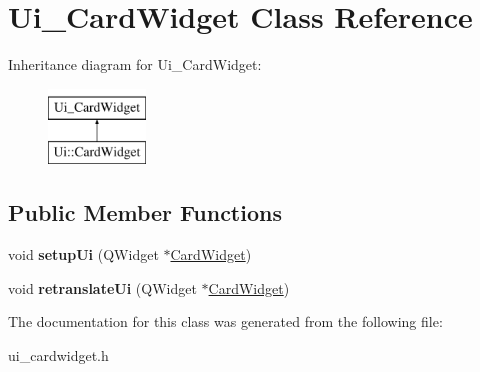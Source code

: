 \hypertarget{class_ui___card_widget}{}\section{Ui\+\_\+\+Card\+Widget Class Reference}
\label{class_ui___card_widget}
Inheritance diagram for Ui\+\_\+\+Card\+Widget\+:\begin{figure}[H]
\begin{center}
\leavevmode
\includegraphics[height=2.000000cm]{class_ui___card_widget}
\end{center}
\end{figure}
\subsection*{Public Member Functions}
\begin{DoxyCompactItemize}
\item 
\mbox{\label{class_ui___card_widget_aa6f73f9fd9070f98ed108783ede6f538}} 
void {\bfseries setup\+Ui} (Q\+Widget $\ast$\hyperlink{class_card_widget}{Card\+Widget})
\item 
\mbox{\label{class_ui___card_widget_a182f67da8cdd1cf87c97f9e01ad4bef7}} 
void {\bfseries retranslate\+Ui} (Q\+Widget $\ast$\hyperlink{class_card_widget}{Card\+Widget})
\end{DoxyCompactItemize}


The documentation for this class was generated from the following file\+:\begin{DoxyCompactItemize}
\item 
ui\+\_\+cardwidget.\+h\end{DoxyCompactItemize}
